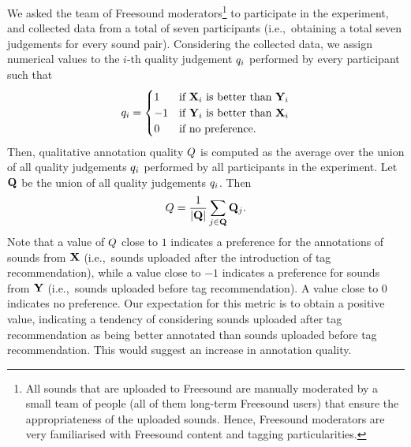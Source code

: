 \begin{itemize}
We asked the team of Freesound moderators\footnote{All sounds that are uploaded to Freesound are manually moderated by a small team of people (all of them long-term Freesound users) that ensure the appropriateness of the uploaded sounds. Hence, Freesound moderators are very familiarised with Freesound content and tagging particularities.} to participate in the experiment, and collected data from a total of seven participants (i.e.,~obtaining a total seven judgements for every sound pair). 	
Considering the collected data, we assign numerical values to the $i$-th quality judgement $q_i$ performed by every participant such that
\begin{equation} q_i = \begin{cases} 
	1 & \text{if } \mathbf{X}_i \text{ is better than } \mathbf{Y}_i \\
	-1 & \text{if } \mathbf{Y}_i \text{ is better than } \mathbf{X}_i \\
	0 & \text{if no preference.}
\end{cases} \label{impact:eq:quality_judgement_cases} \end{equation}
Then, qualitative annotation quality $Q$ is computed as the average over the union of all quality judgements $q_i$ performed by all participants in the experiment. Let $\mathbf{Q}$ be the union of all quality judgements $q_i$. Then
\begin{equation} Q = \frac{1}{|\mathbf{Q}|}\sum\limits_{j \in \mathbf{Q}}{\mathbf{Q}_j}. \label{impact:eq:quality_judgement_metric} \end{equation}
Note that a value of $Q$ close to $1$ indicates a preference for the annotations of sounds from $\mathbf{X}$ (i.e.,~sounds uploaded after the introduction of tag recommendation), while a value close to $-1$ indicates a preference for sounds from $\mathbf{Y}$ (i.e.,~sounds uploaded before tag recommendation). A value close to $0$ indicates no preference. Our expectation for this metric is to obtain a positive value, indicating a tendency of considering sounds uploaded after tag recommendation as being better annotated than sounds uploaded before tag recommendation. This would suggest an increase in annotation quality.

\end{itemize}


